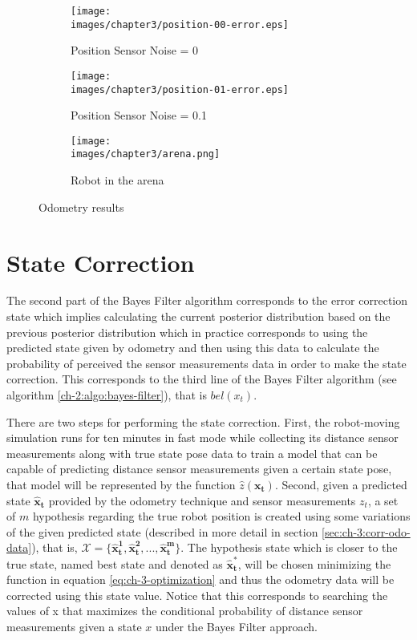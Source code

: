\begin{figure}[h!]
  \centering
  \begin{subfigure}[b]{0.47\linewidth}
  	\texttt{[image: \\images/chapter3/position-00-error.eps]}
	\caption{Position Sensor Noise = 0}
  	\label{fig:ch-3:noise-0}
  \end{subfigure}
  \begin{subfigure}[b]{0.47\linewidth}
  	\texttt{[image: \\images/chapter3/position-01-error.eps]}
	\caption{Position Sensor Noise = 0.1}
  	\label{fig:ch-3:noise-1}
  \end{subfigure}
  \begin{subfigure}[b]{0.6\linewidth}
  	\texttt{[image: \\images/chapter3/arena.png]}
	\caption{Robot in the arena}
  	\label{fig:ch-3:arena}
  \end{subfigure}
  \caption{Odometry results}
  \label{fig:ch-3:odometry-res}
\end{figure}


\section{State Correction}

The second part of the Bayes Filter algorithm corresponds to the error correction state which implies calculating the current posterior distribution based on the previous posterior distribution which in practice corresponds to using the predicted state given by odometry and then using this data to calculate the probability of perceived the sensor measurements data in order to make the state correction. This corresponds to the third line of the Bayes Filter algorithm (see algorithm \ref{ch-2:algo:bayes-filter}), that is $bel(x_t)$.

There are two steps for performing the state correction. First, the robot-moving simulation runs for ten minutes in fast mode while collecting its distance sensor measurements along with true state pose data to train a model that can be capable of predicting distance sensor measurements given a certain state pose, that model will be represented by the function $\hat z(\mathbf{x_t})$. Second, given a predicted state $\mathbf{\hat x_t}$ provided by the odometry technique and sensor measurements $z_t$, a set of $m$ hypothesis regarding the true robot position is created using some variations of the given predicted state (described in more detail in section \ref{sec:ch-3:corr-odo-data}), that is, $\mathcal{X} = \{\mathbf{\hat x_t^1}, \mathbf{\hat x_t^2}, ..., \mathbf{\hat x_t^m}\}$. The hypothesis state which is closer to the true state, named best state and denoted as $\mathbf{\hat x_t^*}$,  will be chosen minimizing the function in equation \ref{eq:ch-3-optimization} and thus the odometry data will be corrected using this state value. Notice that this corresponds to searching the values of x that maximizes the conditional probability of distance sensor measurements given a state $x$ under the Bayes Filter approach.

